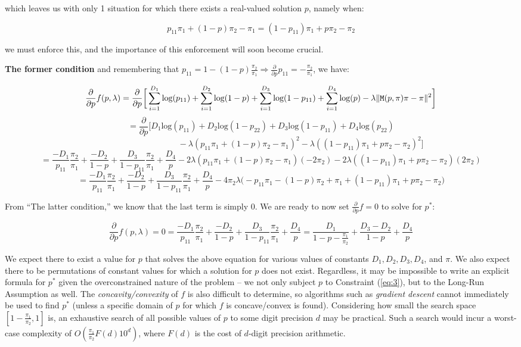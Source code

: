 \documentclass{article}
\DeclarePairedDelimiter\norm{\lVert}{\rVert}
\begin{document}
which leaves us with only 1 situation for which there exists a real-valued solution $p$, namely when:

\[
p_{11}\pi_1 + (1-p)\pi_2 - \pi_1
=
(1-p_{11})\pi_1 + p\pi_2 - \pi_2
\]

we must enforce this, and the importance of this enforcement will soon become crucial.


\textbf{The former condition} and remembering that $p_{11} = 1-(1-p)\frac{\pi_2}{\pi_1} \Rightarrow \frac{\partial}{\partial p} p_{11} = -\frac{\pi_2}{\pi_1}$, we have:

\[
\frac{\partial}{\partial p} f(p, \lambda)
= \frac{\partial}{\partial p} \bigg[
    \sum^{D_1}_{i=1} \text{log}(p_{11})
    + \sum^{D_2}_{i=1} \text{log}(1-p)
    + \sum^{D_3}_{i=1} \text{log}(1-p_{11})
    + \sum^{D_4}_{i=1} \text{log}(p)
    - \lambda \norm{ \texttt{M}(p,\pi)\pi - \pi }^2
\bigg]
\]\[
= \frac{\partial}{\partial p} \big[
    D_1\text{log}(p_{11})
    + D_2\text{log}(1-p_{22})
    + D_3\text{log}(1-p_{11})
    + D_4\text{log}(p_{22})
\]\[
    \hspace{4cm}
    - \lambda (p_{11}\pi_1 + (1-p)\pi_2 - \pi_1)^2
    - \lambda ((1-p_{11})\pi_1 + p\pi_2 - \pi_2)^2
\big]
\]\[
=
    \frac{-D_1}{p_{11}}\frac{\pi_2}{\pi_1}
    + \frac{-D_2}{1-p}
    + \frac{D_3}{1-p_{11}}\frac{\pi_2}{\pi_1}
    + \frac{D_4}{p}
    - 2\lambda (p_{11}\pi_1 + (1-p)\pi_2 - \pi_1) (-2\pi_2)
    - 2\lambda ((1-p_{11})\pi_1 + p\pi_2 - \pi_2) (2\pi_2)
\]\[
=
    \frac{-D_1}{p_{11}}\frac{\pi_2}{\pi_1}
    + \frac{-D_2}{1-p}
    + \frac{D_3}{1-p_{11}}\frac{\pi_2}{\pi_1}
    + \frac{D_4}{p}
    - 4\pi_2\lambda \big( -p_{11}\pi_1 - (1-p)\pi_2 + \pi_1 + (1-p_{11})\pi_1 + p\pi_2 - \pi_2 \big)
\]

From ``The latter condition,'' we know that the last term is simply 0. We are ready to now set $\frac{\partial}{\partial p} f = 0$ to solve for $p^*$:

\[
\frac{\partial}{\partial p} f(p, \lambda)
= 0
=
    \frac{-D_1}{p_{11}}\frac{\pi_2}{\pi_1}
    + \frac{-D_2}{1-p}
    + \frac{D_3}{1-p_{11}}\frac{\pi_2}{\pi_1}
    + \frac{D_4}{p}
=
    \frac{D_1}{1-p-\frac{\pi_1}{\pi_2}}
    + \frac{D_3-D_2}{1-p}
    + \frac{D_4}{p}
\]

We expect there to exist a value for $p$ that solves the above equation for various values of constants $D_1, D_2, D_3, D_4$, and $\pi$. We also expect there to be permutations of constant values for which a solution for $p$ does not exist. Regardless, it may be impossible to write an explicit formula for $p^*$ given the overconstrained nature of the problem -- we not only subject $p$ to Constraint (\ref{eq:3}), but to the Long-Run Assumption as well. The \textit{concavity/convexity} of $f$ is also difficult to determine, so algorithms such as \textit{gradient descent} cannot immediately be used to find $p^*$ (unless a specific domain of $p$ for which $f$ is concave/convex is found). Considering how small the search space $[1-\frac{\pi_1}{\pi_2},1]$ is, an exhaustive search of all possible values of $p$ to some digit precision $d$ may be practical. Such a search would incur a worst-case complexity of $O(\frac{\pi_1}{\pi_2}F(d)10^d)$, where $F(d)$ is the cost of $d$-digit precision arithmetic.
\end{document}
